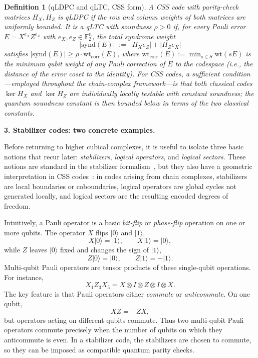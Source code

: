 \documentclass[10pt]{article}
\theoremstyle{compactdef}
\newtheorem{definition}{Definition}
\begin{document}
\begin{definition}[qLDPC and qLTC, CSS form]
A CSS code with parity-check matrices $H_X,H_Z$ is \emph{qLDPC} if the row and column weights of both matrices are uniformly bounded. It is a \emph{qLTC} with soundness $\rho>0$ if, for every Pauli error $E = X^{e_X}Z^{e_Z}$ with $e_X,e_Z\in\mathbb F_2^n$, the total syndrome weight
\[
|\mathrm{synd}(E)| \;:=\; |H_X e_Z| + |H_Z e_X|
\]
satisfies $|\mathrm{synd}(E)| \ge \rho\cdot \mathrm{wt}_{\mathrm{corr}}(E)$, where $\mathrm{wt}_{\mathrm{corr}}(E):=\min_{s\in S}\mathrm{wt}(sE)$ is the minimum qubit weight of any Pauli correction of $E$ to the codespace (i.e., the distance of the error coset to the identity). For CSS codes, a \emph{sufficient} condition---employed throughout the chain-complex framework---is that both classical codes $\ker H_X$ and $\ker H_Z$ are individually locally testable with constant soundness; the quantum soundness constant is then bounded below in terms of the two classical constants.~\cite{DLV,WLH}
\end{definition}


\textbf{3. Stabilizer codes: two concrete examples.}

Before returning to higher cubical complexes, it is useful to isolate three basic notions that recur later: 
\emph{stabilizers}, \emph{logical operators}, and \emph{logical sectors}.  These notions are standard in the stabilizer formalism~\cite{Gottesman1997}, but they also have a geometric interpretation in CSS codes~\cite{CS1996}: in codes arising from chain complexes, stabilizers are local boundaries or coboundaries, logical operators are global cycles not generated locally, and logical sectors are the resulting encoded degrees of freedom.~\cite{Kitaev2003}


Intuitively, a Pauli operator is a basic \emph{bit-flip} or \emph{phase-flip} operation on one or more qubits. The operator $X$ flips $|0\rangle$ and $|1\rangle$,
\[
X|0\rangle=|1\rangle,
\qquad
X|1\rangle=|0\rangle,
\]
while $Z$ leaves $|0\rangle$ fixed and changes the sign of $|1\rangle$,
\[
Z|0\rangle=|0\rangle,
\qquad
Z|1\rangle=-|1\rangle.
\]
Multi-qubit Pauli operators are tensor products of these single-qubit operations. For instance,
\[
X_1Z_3X_5
=
X\otimes I\otimes Z\otimes I\otimes X.
\]
The key feature is that Pauli operators either \emph{commute} or \emph{anticommute}. On one qubit,
\[
XZ=-ZX,
\]
but operators acting on different qubits commute. Thus two multi-qubit Pauli operators commute precisely when the number of qubits on which they anticommute is even. In a stabilizer code, the stabilizers are chosen to commute, so they can be imposed as compatible quantum parity checks.
\end{document}
